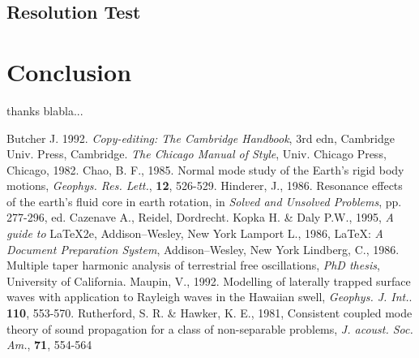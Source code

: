 \documentclass[extra,mreferee]{gji}
\begin{document}
\subsection{Resolution Test}


\section{Conclusion}


\begin{acknowledgments}
thanks blabla...
\end{acknowledgments}


\newpage

\begin{thebibliography}{}  
    Butcher J. 1992. {\it Copy-editing: The Cambridge  
    Handbook}, 3rd edn, Cambridge Univ. Press, Cambridge.
    {\it The Chicago Manual of Style}, Univ.   
    Chicago Press, Chicago, 1982.
    Chao, B. F., 1985. Normal mode study of the Earth's rigid 
     body motions, {\it Geophys. Res. Lett.}, {\bf 12}, 526-529.
    Hinderer, J., 1986. Resonance effects of the earth's fluid
    core in earth rotation, in {\it Solved and Unsolved 
    Problems}, pp. 277-296, ed. Cazenave A., Reidel, 
    Dordrecht.
    Kopka H. \& Daly P.W., 1995, \textit{A guide to} \LaTeX2e,
    Addison--Wesley, New York  
    Lamport L., 1986,  \LaTeX: {\it A Document   
    Preparation System}, Addison--Wesley, New York  
    Lindberg, C., 1986.  Multiple taper harmonic analysis of 
    terrestrial free oscillations, {\it PhD thesis}, 
    University of California.
    Maupin, V., 1992. Modelling of laterally trapped surface 
    waves with application to Rayleigh waves in the Hawaiian 
    swell, {\it Geophys. J. Int.}. {\bf 110}, 553-570.     	
      Rutherford, S. R. \& Hawker, K. E., 1981, 
    Consistent coupled mode theory of sound propagation for a 
    class of non-separable problems, 
   {\it J. acoust. Soc. Am.}, {\bf 71}, 554-564
\end{thebibliography}  
  
\end{document}
